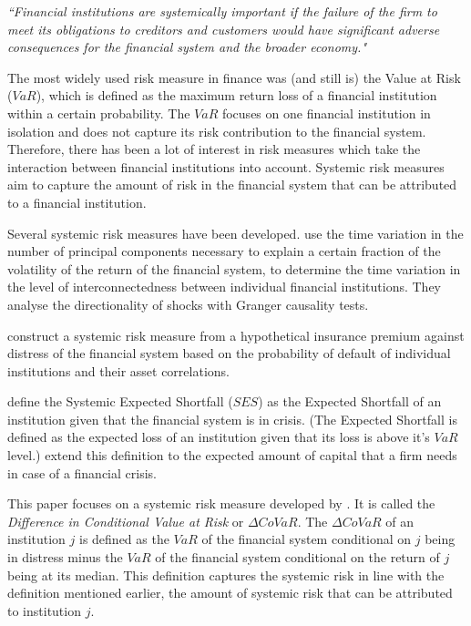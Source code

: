 \documentclass[12pt]{article}
\begin{document}
\textit{``Financial institutions are systemically important if the failure of the firm to meet its obligations to creditors and customers would have significant adverse consequences for the financial system and the broader economy."}

The most widely used risk measure in finance was (and still is) the Value at Risk ($VaR$), which is defined as the maximum return loss of a financial institution within a certain probability. The $VaR$ focuses on one financial institution in isolation and does not capture its risk contribution to the financial system. Therefore, there has been a lot of interest in risk measures which take the interaction between financial institutions into account. Systemic risk measures aim to capture the amount of risk in the financial system that can be attributed to a financial institution.

Several systemic risk measures have been developed. \citet{billio} use the time variation in the number of principal components necessary to explain a certain fraction of the volatility of the return of the financial system, to determine the time variation in the level of interconnectedness between individual financial institutions. They analyse the directionality of shocks with Granger causality tests. 

\citet{huang} construct a systemic risk measure from a hypothetical insurance premium against distress of the financial system based on the probability of default of individual institutions and their asset correlations. 

\citet{acharya1} define the Systemic Expected Shortfall ($SES$) as the Expected Shortfall of an institution given that the financial system is in crisis. (The Expected Shortfall is defined as the expected loss of an institution given that its loss is above it's $VaR$ level.)  \citet{acharya2} extend this definition to the expected amount of capital that a firm needs in case of a financial crisis.

This paper focuses on a systemic risk measure developed by \citet{adrian}. It is called the \textit{Difference in Conditional Value at Risk} or $\Delta CoVaR$. The $\Delta CoVaR$ of an institution $j$ is defined as the $VaR$ of the financial system conditional on $j$ being in distress minus the $VaR$ of the financial system conditional on the return of $j$ being at its median. This definition captures the systemic risk in line with the definition mentioned earlier, the amount of systemic risk that can be attributed to institution $j$.
\end{document}
